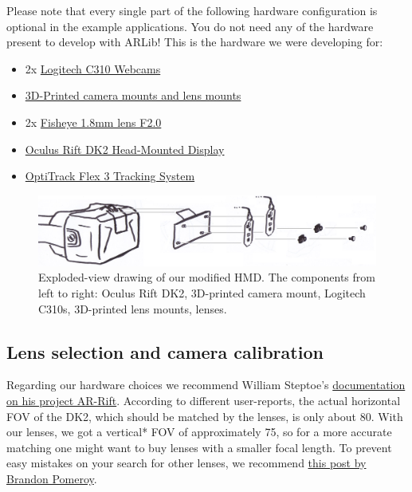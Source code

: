 Please note that every single part of the following hardware
configuration is optional in the example applications. You do not need
any of the hardware present to develop with ARLib! This is the hardware we were
developing for:
\begin{itemize}
	\item{2x \href{http://www.logitech.com/de-de/product/hd-webcam-c310}{Logitech C310 Webcams}}
	\item{\href{https://github.com/ands/OculusMeetsAR/tree/master/Hardware/Printmodels}{3D-Printed camera mounts and lens mounts}}
	\item{2x \href{http://www.camera2000.com/en/cctv-board-security-video-camera-1-8mm-lens-f2-0.html}{Fisheye 1.8mm lens F2.0}}
	\item{\href{https://www.oculus.com/dk2/}{Oculus Rift DK2 Head-Mounted Display}}
	\item{\href{http://www.optitrack.com/products/flex-3/}{OptiTrack Flex 3 Tracking System}}
\end{itemize}

\begin{figure}[htb!]
	\centering
	\includegraphics{explosion}
	\vspace{1mm}
	\caption{Exploded-view drawing of our modified HMD. The components from left to right: Oculus Rift DK2, 3D-printed camera mount, Logitech C310s, 3D-printed lens mounts, lenses.}
	\label{fig:explosion}
\end{figure}

\subsection{Lens selection and camera calibration}\label{lens-selection-and-camera-calibration}

Regarding our hardware choices we recommend William Steptoe's
\href{http://willsteptoe.com/post/67399683294/ar-rift-camera-selection-part-2}{documentation
on his project AR-Rift}. According to different user-reports, the actual
horizontal FOV of the DK2, which should be matched by the lenses, is
only about 80\textdegree. With our lenses, we got a vertical* FOV of
approximately 75\textdegree, so for a more accurate matching one might want to buy
lenses with a smaller focal length. To prevent easy mistakes on your
search for other lenses, we recommend
\href{http://pomeroyprinting.blogspot.de/2014/04/modifying-logitech-c310-hd-webcam.html}{this
post by Brandon Pomeroy}.

